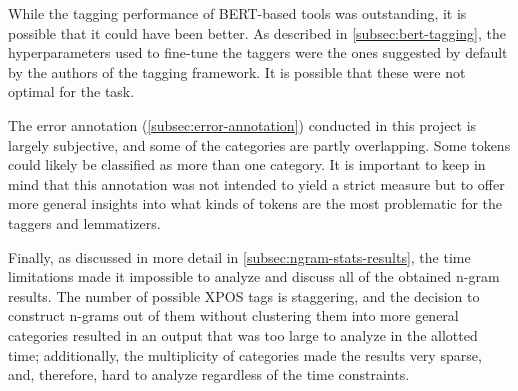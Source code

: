 While the tagging performance of BERT-based tools was outstanding, it is possible that it could have been better. As described in \autoref{subsec:bert-tagging}, the hyperparameters used to fine-tune the taggers were the ones suggested by default by the authors of the tagging framework. It is possible that these were not optimal for the task.

The error annotation (\autoref{subsec:error-annotation}) conducted in this project is largely subjective, and some of the categories are partly overlapping. Some tokens could likely be classified as more than one category. It is important to keep in mind that this annotation was not intended to yield a strict measure but to offer more general insights into what kinds of tokens are the most problematic for the taggers and lemmatizers.

Finally, as discussed in more detail in \autoref{subsec:ngram-stats-results}, the time limitations made it impossible to analyze and discuss all of the obtained n-gram results. The number of possible XPOS tags is staggering, and the decision to construct n-grams out of them without clustering them into more general categories resulted in an output that was too large to analyze in the allotted time; additionally, the multiplicity of categories made the results very sparse, and, therefore, hard to analyze regardless of the time constraints.